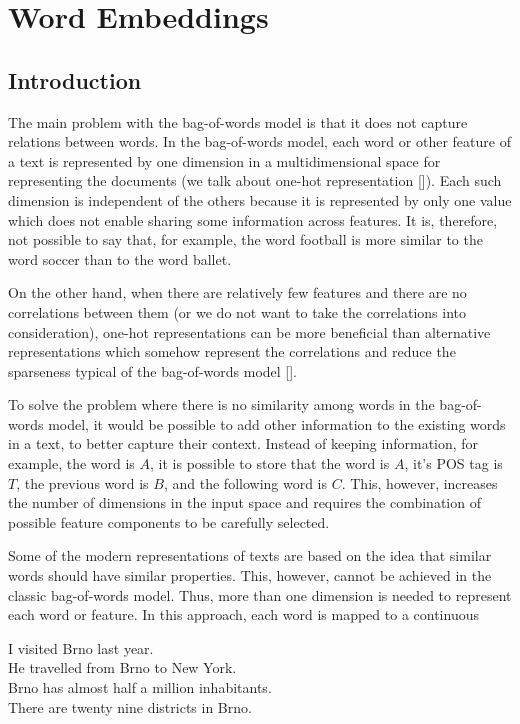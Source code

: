 \chapter{Word Embeddings}
\section{Introduction}
The main problem with the bag-of-words model is that it does not capture relations between words. In the bag-of-words model, each word or other feature of a text is represented by one dimension in a multidimensional space for representing the documents (we talk about one-hot representation [\cite{ref101}]). Each such dimension is independent of the others because it is represented by only one value which does not enable sharing some information across features. It is, therefore, not possible to say that, for example, the word football is more similar to the word soccer than to the word ballet.

On the other hand, when there are relatively few features and there are no correlations between them (or we do not want to take the correlations into consideration), one-hot representations can be more beneficial than alternative representations which somehow represent the correlations and reduce the sparseness typical of the bag-of-words model [\cite{ref101}].

To solve the problem where there is no similarity among words in the bag-of-words model, it would be possible to add other information to the existing words in a text, to better capture their context. Instead of keeping information, for example, the word is $A$, it is possible to store that the word is $A$, it's POS tag is $T$, the previous word is $B$, and the following word is $C$. This, however, increases the number of dimensions in the input space and requires the combination of possible feature components to be carefully selected.

Some of the modern representations of texts are based on the idea that similar words should have similar properties. This, however, cannot be achieved in the classic bag-of-words model. Thus, more than one dimension is needed to represent each word or feature. In this approach, each word is mapped to a continuous

\begin{displayquote}
I visited Brno last year. \\ 
He travelled from Brno to New York.\\ 
Brno has almost half a million inhabitants.\\ 
There are twenty nine districts in Brno.
\end{displayquote}

